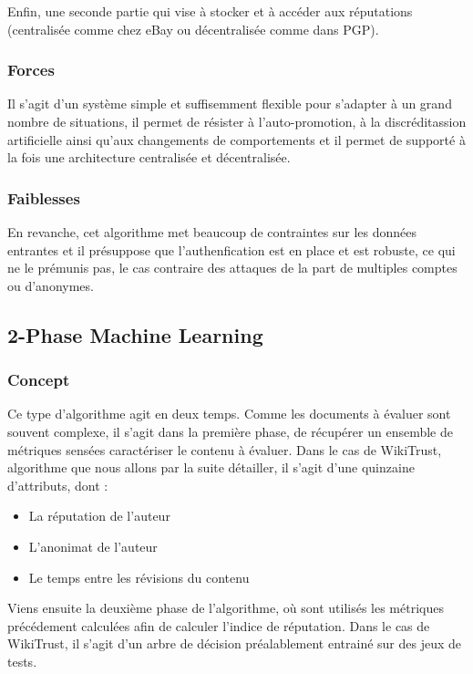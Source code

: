 \documentclass[a4paper, 11pt]{article} %
\begin{document}
Enfin, une seconde partie qui vise à stocker et à accéder aux réputations (centralisée comme chez eBay ou décentralisée comme dans PGP).

\subsubsection{Forces}
Il s'agit d'un système simple et suffisemment flexible pour s'adapter à un grand nombre de situations, il permet de résister à l'auto-promotion, à la discréditassion artificielle ainsi qu'aux changements de comportements et il permet de supporté à la fois une architecture centralisée et décentralisée.

\subsubsection{Faiblesses}
En revanche, cet algorithme met beaucoup de contraintes sur les données entrantes et il présuppose que l'authenfication est en place et est robuste, ce qui ne le prémunis pas, le cas contraire des attaques de la part de multiples comptes ou d'anonymes.

\subsection{2-Phase Machine Learning}
\subsubsection{Concept}
Ce type d'algorithme agit en deux temps.
Comme les documents à évaluer sont souvent complexe, il s'agit dans la première phase, de récupérer un ensemble de métriques sensées caractériser le contenu à évaluer.
Dans le cas de WikiTrust, algorithme que nous allons par la suite détailler, il s'agit d'une quinzaine d'attributs, dont :
\begin{itemize}
	\item La réputation de l'auteur
	\item L'anonimat de l'auteur
	\item Le temps entre les révisions du contenu
\end{itemize}
Viens ensuite la deuxième phase de l'algorithme, où sont utilisés les métriques précédement calculées afin de calculer l'indice de réputation.
Dans le cas de WikiTrust, il s'agit d'un arbre de décision préalablement entrainé sur des jeux de tests.
\end{document}
